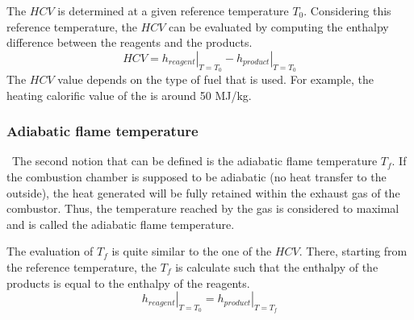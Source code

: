 The \(HCV\) is determined at a given reference temperature \(T_0\). Considering this reference temperature, the \(HCV\) can be evaluated by computing the enthalpy difference between the reagents and the products.
\begin{equation}
    HCV = \left.h_{reagent}\right|_{T=T_0} - \left.h_{product}\right|_{T=T_0}\label{eq:C3_HCV2}
\end{equation}
The \(HCV\) value depends on the type of fuel that is used. For example, the heating calorific value of the  is around 50 MJ/kg.

\subsubsection{Adiabatic flame temperature}
\quad\ The second notion that can be defined is the adiabatic flame temperature \(T_f\). If the combustion chamber is supposed to be adiabatic (no heat transfer to the outside), the heat generated will be fully retained within the exhaust gas of the combustor. Thus, the temperature reached by the gas is considered to maximal and is called the adiabatic flame temperature.

The evaluation of \(T_f\) is quite similar to the one of the \(HCV\). There, starting from the reference temperature, the \(T_f\) is calculate such that the enthalpy of the products is equal to the enthalpy of the reagents.
\begin{equation}
    \left.h_{reagent}\right|_{T=T_0} = \left.h_{product}\right|_{T=T_f}\label{eq:C3_T_f}
\end{equation}
\newpage
